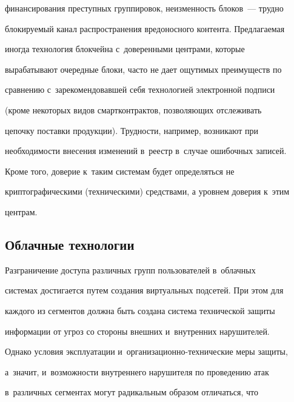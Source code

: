 финансирования преступных группировок, неизменность блоков~--- трудно 


блокируемый канал распространения вредоносного контента. Предлагаемая 


иногда технология блокчейна с~доверенными центрами, которые 


вырабатывают очередные блоки, часто не дает ощутимых преимуществ по 


сравнению с~зарекомендовавшей себя технологией электронной подписи 


(кроме некоторых видов смартконтрактов, позволяющих отслеживать 


цепочку поставки продукции). Трудности, например, возникают при 


необходимости внесения изменений в~реестр в~случае ошибочных записей. 


Кроме того, доверие к~таким системам будет определяться не 


криптографическими (техническими) средствами, а уровнем доверия к~этим 


центрам.





\vspace*{-4pt}


     


     \subsection{Облачные технологии }


     


     \vspace*{-2pt}


     


     Разграничение доступа различных групп пользователей в~облачных 


системах достигается путем создания виртуальных подсетей. При этом для 


каждого из сегментов должна быть создана система технической защиты 


информации от угроз со стороны внешних и~внутренних нарушителей. 


Однако условия эксплуатации и~организационно-технические меры защиты, 


а~значит, и~возможности внутреннего нарушителя по проведению атак 


в~различных сегментах могут радикальным образом отличаться, что 


